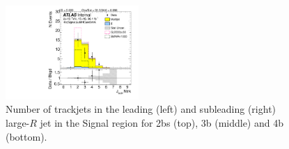 \begin{figure}[htbp!]
\begin{center}
\includegraphics[width=0.45\textwidth,angle=-90]{figures/boosted/Signal/b77_FourTag_Signal_sublHCand_ntrk.pdf}
  \caption{Number of trackjets in the leading (left) and subleading (right) large-$R$ jet in the Signal region for 2bs (top), 3b (middle) and 4b (bottom).}
  \label{fig:boosted-ntrk-Signal}
\end{center}
\end{figure}